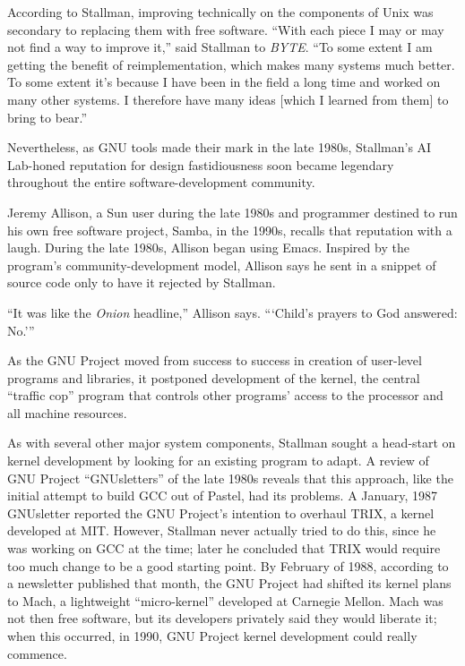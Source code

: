According to Stallman, improving technically on the components of Unix was secondary to replacing them with free software. ``With each piece I may or may not find a way to improve it,'' said Stallman to \textit{BYTE}. ``To some extent I am getting the benefit of reimplementation, which makes many systems much better. To some extent it's because I have been in the field a long time and worked on many other systems. I therefore have many ideas [which I learned from them] to bring to bear.''

Nevertheless, as GNU tools made their mark in the late 1980s, Stallman's AI Lab-honed reputation for design fastidiousness soon became legendary throughout the entire software-development community.

Jeremy Allison, a Sun user during the late 1980s and programmer destined to run his own free software project, Samba, in the 1990s, recalls that reputation with a laugh. During the late 1980s, Allison began using Emacs. Inspired by the program's community-development model, Allison says he sent in a snippet of source code only to have it rejected by Stallman.

``It was like the \textit{Onion} headline,'' Allison says. ``\hspace{0.01in}`Child's prayers to God answered: No.'\hspace{0.01in}''

As the GNU Project moved from success to success in creation of user-level programs and libraries, it postponed development of the kernel, the central ``traffic cop'' program that controls other programs' access to the processor and all machine resources.

As with several other major system components, Stallman sought a head-start on kernel development by looking for an existing program to adapt. A review of GNU Project ``GNUsletters'' of the late 1980s reveals that this approach, like the initial attempt to build GCC out of Pastel, had its problems. A January, 1987 GNUsletter reported the GNU Project's intention to overhaul TRIX, a kernel developed at MIT. However, Stallman never actually tried to do this, since he was working on GCC at the time; later he concluded that TRIX would require too much change to be a good starting point. By February of 1988, according to a newsletter published that month, the GNU Project had shifted its kernel plans to Mach, a lightweight ``micro-kernel'' developed at Carnegie Mellon. Mach was not then free software, but its developers privately said they would liberate it; when this occurred, in 1990, GNU Project kernel development could really commence.

